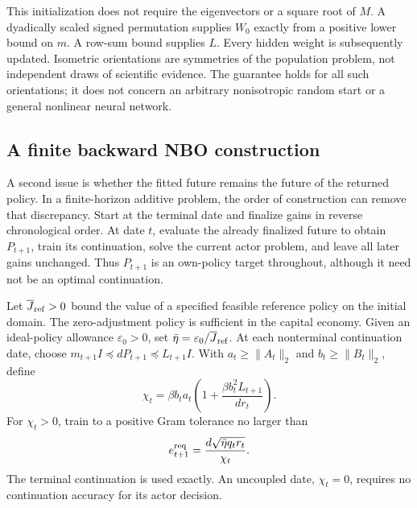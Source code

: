 This initialization does not require the eigenvectors or a square root of
$M$. A dyadically scaled signed permutation supplies $W_0$ exactly from a
positive lower bound on $m$. A row-sum bound supplies $L$. Every hidden
weight is subsequently updated. Isometric orientations are symmetries of
the population problem, not independent draws of scientific evidence.
The guarantee holds for all such orientations; it does not concern an
arbitrary nonisotropic random start or a general nonlinear neural network.

\subsection{A finite backward NBO construction}\label{sec:r25backward}
A second issue is whether the fitted future remains the future of the returned
policy. In a finite-horizon additive problem, the order of construction can
remove that discrepancy. Start at the terminal date and finalize gains in
reverse chronological order. At date $t$, evaluate the already finalized
future to obtain $P_{t+1}$, train its continuation, solve the current actor
problem, and leave all later gains unchanged. Thus $P_{t+1}$ is an own-policy
target throughout, although it need not be an optimal continuation.

Let $\overline J_{\rm ref}>0$ bound the value of a specified feasible reference
policy on the initial domain. The zero-adjustment policy is sufficient in
the capital economy. Given an ideal-policy allowance $\varepsilon_0>0$, set
$\bar\eta=\varepsilon_0/\overline J_{\rm ref}$. At each nonterminal
continuation date, choose $m_{t+1}I\preceq dP_{t+1}\preceq L_{t+1}I$.
With $a_t\geq\|A_t\|_2$ and $b_t\geq\|B_t\|_2$, define
\begin{equation}
 \chi_t=\beta b_t a_t
       \left(1+\frac{\beta b_t^2L_{t+1}}{d r_t}\right).
 \label{eq:r25chi}
\end{equation}
For $\chi_t>0$, train to a positive Gram tolerance no larger than
\begin{equation}
 e_{t+1}^{\rm req}
       =\frac{d\sqrt{\bar\eta q_t r_t}}{\chi_t}.
 \label{eq:r25allocation}
\end{equation}
The terminal continuation is used exactly. An uncoupled date, $\chi_t=0$,
requires no continuation accuracy for its actor decision.

